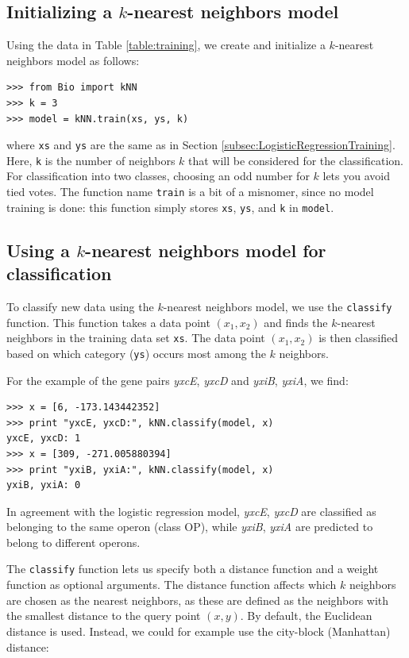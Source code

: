 \documentclass{report}
\begin{document}
\subsection{Initializing a $k$-nearest neighbors model}

Using the data in Table \ref{table:training}, we create and initialize a $k$-nearest neighbors model as follows:

\begin{verbatim}
>>> from Bio import kNN
>>> k = 3
>>> model = kNN.train(xs, ys, k)
\end{verbatim}

where \verb+xs+ and \verb+ys+ are the same as in Section \ref{subsec:LogisticRegressionTraining}. Here, \verb+k+ is the number of neighbors $k$ that will be considered for the classification. For classification into two classes, choosing an odd number for $k$ lets you avoid tied votes. The function name \verb+train+ is a bit of a misnomer, since no model training is done: this function simply stores \verb+xs+, \verb+ys+, and \verb+k+ in \verb+model+.

\subsection{Using a $k$-nearest neighbors model for classification}

To classify new data using the $k$-nearest neighbors model, we use the \verb+classify+ function. This function takes a data point $(x_1,x_2)$ and finds the $k$-nearest neighbors in the training data set \verb+xs+. The data point $(x_1, x_2)$ is then classified based on which category (\verb+ys+) occurs most among the $k$ neighbors.

For the example of the gene pairs {\it yxcE}, {\it yxcD} and {\it yxiB}, {\it yxiA}, we find:
\begin{verbatim}
>>> x = [6, -173.143442352]
>>> print "yxcE, yxcD:", kNN.classify(model, x)
yxcE, yxcD: 1
>>> x = [309, -271.005880394]
>>> print "yxiB, yxiA:", kNN.classify(model, x)
yxiB, yxiA: 0
\end{verbatim}
In agreement with the logistic regression model, {\it yxcE}, {\it yxcD} are classified as belonging to the same operon (class OP), while {\it yxiB}, {\it yxiA} are predicted to belong to different operons.

The \verb+classify+ function lets us specify both a distance function and a weight function as optional arguments. The distance function affects which $k$ neighbors are chosen as the nearest neighbors, as these are defined as the neighbors with the smallest distance to the query point $(x, y)$. By default, the Euclidean distance is used. Instead, we could for example use the city-block (Manhattan) distance:
\end{document}
